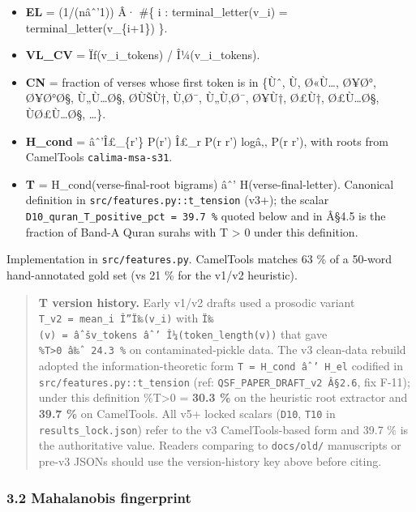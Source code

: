 \documentclass[
]{article}
\providecommand{\tightlist}{%
  \setlength{\itemsep}{0pt}\setlength{\parskip}{0pt}}
\begin{document}
\begin{itemize}
\tightlist
\item
  \textbf{EL} = (1/(nâˆ'1)) Â· \#\{ i : terminal\_letter(v\_i) =
  terminal\_letter(v\_\{i+1\}) \}.
\item
  \textbf{VL\_CV} = Ïƒ(\textbar v\_i\textbar\_tokens) /
  Î¼(\textbar v\_i\textbar\_tokens).
\item
  \textbf{CN} = fraction of verses whose first token is in \{Ùˆ, Ù,
  Ø«Ù\ldots, Ø¥Ø°, Ø¥Ø°Ø§, Ù„Ù\ldots Ø§, Ø\-ÙŠÙ†, Ù‚Ø¯, Ù„Ù‚Ø¯, Ø¥Ù†,
  Ø£Ù†, Ø£Ù\ldots Ø§, ÙØ£Ù\ldots Ø§, \ldots\}.
\item
  \textbf{H\_cond} = âˆ'Î£\_\{r'\} P(r') Î£\_r P(r \textbar{} r') logâ‚‚
  P(r \textbar{} r'), with roots from CamelTools
  \texttt{calima-msa-s31}.
\item
  \textbf{T} = H\_cond(verse-final-root bigrams) âˆ'
  H(verse-final-letter). Canonical definition in
  \texttt{src/features.py::t\_tension} (v3+); the scalar
  \texttt{D10\_quran\_T\_positive\_pct\ =\ 39.7\ \%} quoted below and in
  Â§4.5 is the fraction of Band-A Quran surahs with T \textgreater{} 0
  under this definition.
\end{itemize}

Implementation in \texttt{src/features.py}. CamelTools matches 63 \% of
a 50-word hand-annotated gold set (vs 21 \% for the v1/v2 heuristic).

\begin{quote}
\textbf{T version history.} Early v1/v2 drafts used a prosodic variant
\texttt{T\_v2\ =\ mean\_i\ \textbar{}Î”Ï‰(v\_i)\textbar{}} with
\texttt{Ï‰(v)\ =\ âˆš\textbar{}v\textbar{}\_tokens\ âˆ’\ Î¼(token\_length(v))}
that gave \texttt{\%T\textgreater{}0\ â‰ˆ\ 24.3\ \%} on
contaminated-pickle data. The v3 clean-data rebuild adopted the
information-theoretic form \texttt{T\ =\ H\_cond\ âˆ’\ H\_el} codified
in \texttt{src/features.py::t\_tension} (ref:
\texttt{QSF\_PAPER\_DRAFT\_v2\ Â§2.6}, fix F-11); under this definition
\%T\textgreater0 = \textbf{30.3 \%} on the heuristic root extractor and
\textbf{39.7 \%} on CamelTools. All v5+ locked scalars (\texttt{D10},
\texttt{T10} in \texttt{results\_lock.json}) refer to the v3
CamelTools-based form and 39.7 \% is the authoritative value. Readers
comparing to \texttt{docs/old/} manuscripts or pre-v3 JSONs should use
the version-history key above before citing.
\end{quote}

\subsubsection{3.2 Mahalanobis
fingerprint}\label{mahalanobis-fingerprint}
\end{document}
